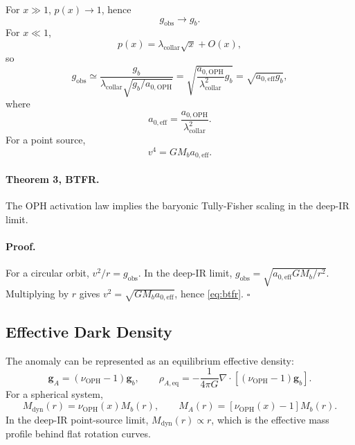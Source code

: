 \documentclass[11pt]{article}
\newcommand{\OPH}{\mathrm{OPH}}
\newcommand{\aoph}{a_{0,\mathrm{OPH}}}
\newcommand{\aeff}{a_{0,\mathrm{eff}}}
\newcommand{\lambdac}{\lambda_{\mathrm{collar}}}
\begin{document}
For \(x\gg1\), \(p(x)\to1\), hence
\begin{equation}
  g_{\mathrm{obs}}\to g_b.
\end{equation}
For \(x\ll1\),
\begin{equation}
  p(x)=\lambdac\sqrt{x}+O(x),
\end{equation}
so
\begin{equation}
  g_{\mathrm{obs}}
  \simeq \frac{g_b}{\lambdac\sqrt{g_b/\aoph}}
  = \sqrt{\frac{\aoph}{\lambdac^2}g_b}
  = \sqrt{\aeff g_b},
\end{equation}
where
\begin{equation}
  \aeff = \frac{\aoph}{\lambdac^2}.
  \label{eq:aeff}
\end{equation}
For a point source,
\begin{equation}
  v^4 = G M_b \aeff.
  \label{eq:btfr}
\end{equation}

\paragraph{Theorem 3, BTFR.}
The OPH activation law implies the baryonic Tully-Fisher scaling in the
deep-IR limit.

\paragraph{Proof.}
For a circular orbit, \(v^2/r=g_{\mathrm{obs}}\).  In the deep-IR limit,
\(g_{\mathrm{obs}}=\sqrt{\aeff G M_b/r^2}\).  Multiplying by \(r\) gives
\(v^2=\sqrt{G M_b\aeff}\), hence \eqref{eq:btfr}. \(\square\)

\subsection{Effective Dark Density}

The anomaly can be represented as an equilibrium effective density:
\begin{equation}
  \mathbf g_A=(\nu_{\OPH}-1)\mathbf g_b,
  \qquad
  \rho_{A,\mathrm{eq}}
   =-\frac{1}{4\pi G}\nabla\cdot[(\nu_{\OPH}-1)\mathbf g_b].
  \label{eq:rhoaeq}
\end{equation}
For a spherical system,
\begin{equation}
  M_{\mathrm{dyn}}(r)=\nu_{\OPH}(x) M_b(r),
  \qquad
  M_A(r)=[\nu_{\OPH}(x)-1]M_b(r).
\end{equation}
In the deep-IR point-source limit, \(M_{\mathrm{dyn}}(r)\propto r\), which is
the effective mass profile behind flat rotation curves.
\end{document}
